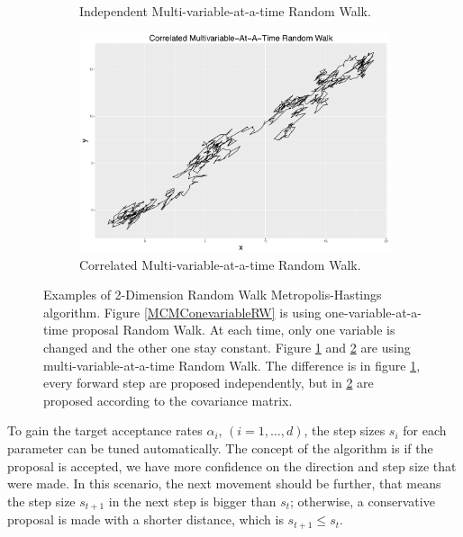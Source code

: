 \begin{figure}[h]
\begin{subfigure}[b]{0.32\textwidth}
    \caption{\footnotesize Independent Multi-variable-at-a-time Random Walk.}\label{MCMCMultivariableRW}
\end{subfigure}
\begin{subfigure}[b]{0.32\textwidth}
     \includegraphics[width=\textwidth]{Chapters/05MCMCOU/plots/ggcorRW.pdf}   
    \caption{\footnotesize Correlated Multi-variable-at-a-time Random Walk.}\label{MCMCCorrelatedRW}
\end{subfigure}
\caption{Examples of 2-Dimension Random Walk Metropolis-Hastings algorithm. Figure \ref{MCMConevariableRW} is using one-variable-at-a-time proposal Random Walk. At each time, only one variable is changed and the other one stay constant. Figure \ref{MCMCMultivariableRW} and \ref{MCMCCorrelatedRW} are using multi-variable-at-a-time Random Walk. The difference is in figure \ref{MCMCMultivariableRW}, every forward step are proposed independently, but in \ref{MCMCCorrelatedRW} are proposed according to the covariance matrix. }
\label{randomwalk}
\end{figure}
To gain the target acceptance rates $\alpha_i$, $(i = 1, \dots, d)$, the step sizes $s_i$ for each parameter can be tuned automatically. The concept of the algorithm is if the proposal is accepted, we have more confidence on the direction and step size that were made. In this scenario, the next movement should be further, that means the step size $s_{t+1}$ in the next step is bigger than $s_t$; otherwise, a conservative proposal is made with a shorter distance, which is $s_{t+1}\leq s_t$. 

